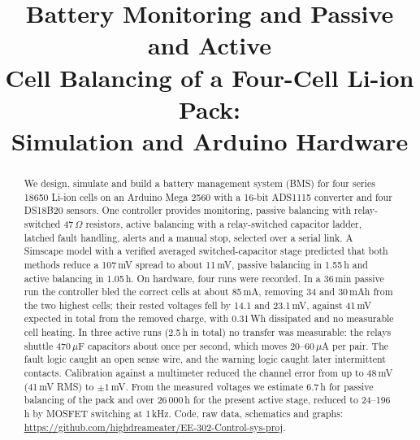 \documentclass[conference]{IEEEtran}
\begin{document}
\title{Battery Monitoring and Passive and Active\\ Cell Balancing of a Four-Cell Li-ion Pack:\\ Simulation and Arduino Hardware}

\author{
\and
{}
\and
{}
\and
{}
}

\maketitle

\begin{abstract}
We design, simulate and build a battery management system (BMS) for four series 18650 Li-ion cells on an Arduino
Mega 2560 with a 16-bit ADS1115 converter and four DS18B20 sensors. One controller provides monitoring, passive
balancing with relay-switched 47\,$\Omega$ resistors, active balancing with a relay-switched capacitor ladder,
latched fault handling, alerts and a manual stop, selected over a serial link. A Simscape model with a verified
averaged switched-capacitor stage predicted that both methods reduce a 107\,mV spread to about 11\,mV, passive
balancing in 1.55\,h and active balancing in 1.05\,h. On hardware, four runs were recorded. In a 36\,min passive run the controller bled the correct cells at about 85\,mA, removing 34 and 30\,mAh from the
two highest cells; their rested voltages fell by 14.1 and 23.1\,mV, against 41\,mV expected in total from the
removed charge, with 0.31\,Wh dissipated and no measurable cell heating. In three
active runs (2.5\,h in total) no transfer was measurable: the relays shuttle 470\,$\mu$F capacitors about once
per second, which moves 20--60\,$\mu$A per pair. The fault logic caught an open sense wire, and the warning logic
caught later intermittent contacts. Calibration against a multimeter reduced the channel error from up to 48\,mV
(41\,mV RMS) to $\pm1$\,mV. From the measured voltages we estimate 6.7\,h for passive balancing of the
pack and over 26\,000\,h for the present active stage, reduced to 24--196\,h by MOSFET switching at 1\,kHz. Code, raw data, schematics and graphs:
\url{https://github.com/highdreameater/EE-302-Control-sys-proj}.
\end{abstract}
\end{document}
